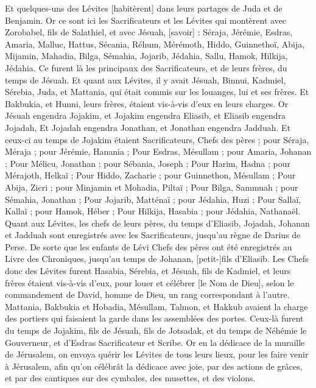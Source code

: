 \begin{multicols}{2}
Et quelques-uns des Lévites [habitèrent] dans leurs partages de Juda et de Benjamin.
\VerseOne{}Or ce sont ici les Sacrificateurs et les Lévites qui montèrent avec Zorobabel, fils de Salathiel, et avec Jésuah, [savoir] : Séraja, Jérémie, Esdras,
Amaria, Malluc, Hattus,
Sécania, Réhum, Mérémoth,
Hiddo, Guinnethoï, Abija,
Mijamin, Mahadia, Bilga,
Sémahia, Jojarib, Jédahia,
Sallu, Hamok, Hilkija, Jédahia. Ce furent là les principaux des Sacrificateurs, et de leurs frères, du temps de Jésuah.
Et quant aux Lévites, il y avait Jésuah, Binnui, Kadmiel, Sérebia, Juda, et Mattania, qui était commis sur les louanges, lui et ses frères.
Et Bakbukia, et Hunni, leurs frères, étaient vis-à-vis d'eux en leurs charges.
Or Jésuah engendra Jojakim, et Jojakim engendra Eliasib, et Eliasib engendra Jojadah,
Et Jojadah engendra Jonathan, et Jonathan engendra Jadduah.
Et ceux-ci au temps de Jojakim étaient Sacrificateurs, Chefs des pères ; pour Séraja, Méraja ; pour Jérémie, Hanania ;
Pour Esdras, Mésullam ; pour Amaria, Johanan ;
Pour Mélicu, Jonathan ; pour Sébania, Joseph ;
Pour Harim, Hadna ; pour Mérajoth, Helkaï ;
Pour Hiddo, Zacharie ; pour Guinnethon, Mésullam ;
Pour Abija, Zicri ; pour Minjamin et Mohadia, Piltaï ;
Pour Bilga, Sammuah ; pour Sémahia, Jonathan ;
Pour Jojarib, Matténaï ; pour Jédahia, Huzi ;
Pour Sallaï, Kallaï ; pour Hamok, Héber ;
Pour Hilkija, Hasabia ; pour Jédahia, Nathanaël.
Quant aux Lévites, les chefs de leurs pères, du temps d'Eliasib, Jojadah, Johanan et Jadduah sont enregistrés avec les Sacrificateurs, jusqu'au règne de Darius de Perse.
De sorte que les enfants de Lévi Chefs des pères ont été enregistrés au Livre des Chroniques, jusqu'au temps de Johanan, [petit-]fils d'Eliasib.
Les Chefs donc des Lévites furent Hasabia, Sérebia, et Jésuah, fils de Kadmiel, et leurs frères étaient vis-à-vis d'eux, pour louer et célébrer [le Nom de Dieu], selon le commandement de David, homme de Dieu, un rang correspondant à l'autre.
Mattania, Bakbukia et Hobadia, Mésullam, Talmon, et Hakkub avaient la charge des portiers qui faisaient la garde dans les assemblées des portes.
Ceux-là furent du temps de Jojakim, fils de Jésuah, fils de Jotsadak, et du temps de Néhémie le Gouverneur, et d'Esdras Sacrificateur et Scribe.
Or en la dédicace de la muraille de Jérusalem, on envoya quérir les Lévites de tous leurs lieux, pour les faire venir à Jérusalem, afin qu'on célébrât la dédicace avec joie, par des actions de grâces, et par des cantiques sur des cymbales, des musettes, et des violons.

\end{multicols}
